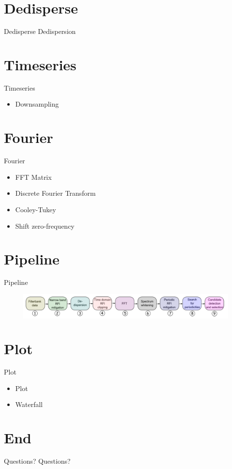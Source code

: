 \documentclass{beamer}
\begin{document}
\section{Dedisperse}
\begin{frame}{Dedisperse}
	Dedispersion
\end{frame}

\section{Timeseries}
\begin{frame}{Timeseries}
	\begin{itemize}
		\item Downsampling
	\end{itemize}
\end{frame}

\section{Fourier}
\begin{frame}{Fourier}
	\begin{itemize}
		\item FFT Matrix
		\item Discrete Fourier Transform
		\item Cooley-Tukey
		\item Shift zero-frequency
	\end{itemize}
\end{frame}

\section{Pipeline}
\begin{frame}{Pipeline}
	\begin{figure}
		\includegraphics[width=\textwidth]{pipeline-order}
	\end{figure}
\end{frame}

\section{Plot}
\begin{frame}{Plot}
	\begin{itemize}
		\item Plot
		\item Waterfall
	\end{itemize}
\end{frame}

\section{End}
\begin{frame}{Questions?}
	Questions?
\end{frame}
\end{document}
